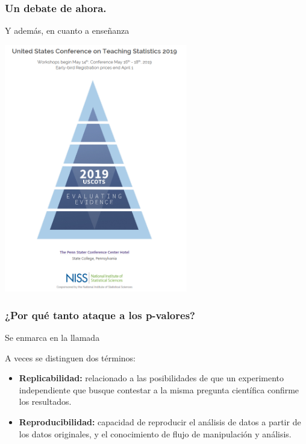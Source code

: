 \documentclass[9pt]{beamer}
\begin{document}
\begin{frame}
  \frametitle{Un debate de ahora.}
  Y además, en cuanto a enseñanza\\ 
  \begin{center}
  \includegraphics[width=8cm]{images/USCOTS}
  \end{center}
\end{frame}


\begin{frame}
  \frametitle{¿Por qué tanto ataque a los p-valores?}
   Se enmarca en la llamada\\
    \begin{center}
\end{center}
\begin{block}{A veces se distinguen dos términos:}
  \begin{itemize}
    \item \textbf{Replicabilidad:} relacionado a las posibilidades de que un
    experimento independiente que busque contestar a la misma pregunta
    científica confirme los resultados.
  \item \textbf{Reproducibilidad:} capacidad de reproducir
    el análisis de datos a partir de los datos originales, y el
    conocimiento de flujo de manipulación y análisis. 
  \end{itemize}
  
\end{block}
\end{frame}
\end{document}

